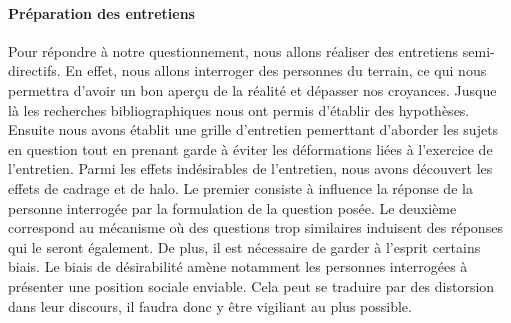 \documentclass[12pt]{article}
\begin{document}




\paragraph{Préparation des entretiens}

Pour répondre à notre questionnement, nous allons réaliser des entretiens semi-directifs. En effet, nous allons interroger des personnes du terrain, ce qui nous permettra d'avoir un bon aperçu de la réalité et dépasser nos croyances. Jusque là les recherches bibliographiques nous ont permis d'établir des hypothèses. Ensuite nous avons établit une grille d'entretien pemerttant d'aborder les sujets en question tout en prenant garde à éviter les déformations liées à l'exercice de l'entretien. Parmi les effets indésirables de l'entretien, nous avons découvert les effets de cadrage et de halo. Le premier consiste à influence la réponse de la personne interrogée par la formulation de la question posée. Le deuxième correspond au mécanisme où des questions trop similaires induisent des réponses qui le seront également. De plus, il est nécessaire de garder à l'esprit certains biais. Le biais de désirabilité amène notamment les personnes interrogées à présenter une position sociale enviable. Cela peut se traduire par des distorsion dans leur discours, il faudra donc y être vigiliant au plus possible.
\end{document}
